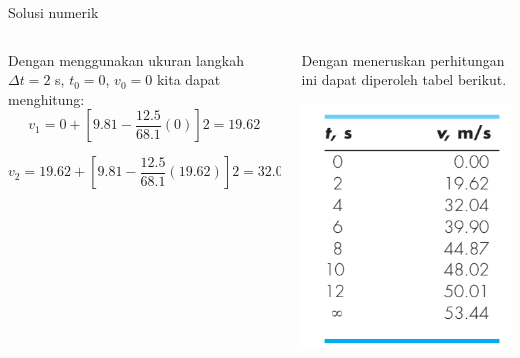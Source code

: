 \begin{frame}{Solusi numerik}

\begin{columns}[T]
\begin{column}{0.5\textwidth}
Dengan menggunakan ukuran langkah \(\Delta t = 2\) s, \(t_0 = 0\),
\(v_0 = 0\) kita dapat menghitung: \[
v_1 = 0 + \left[ 9.81 - \frac{12.5}{68.1}(0) \right] 2 = 19.62
\]

\[
v_2 = 19.62 + \left[ 9.81 - \frac{12.5}{68.1}(19.62) \right] 2 = 32.04
\]
\end{column}

\begin{column}{0.5\textwidth}

Dengan meneruskan perhitungan ini dapat diperoleh tabel berikut.

{\centering
\includegraphics[width=\textwidth,height=0.5\textheight]{../chapra_7th/Chapra_Example_1_2_table.png}
\par}

\end{column}

\end{columns}

\end{frame}



